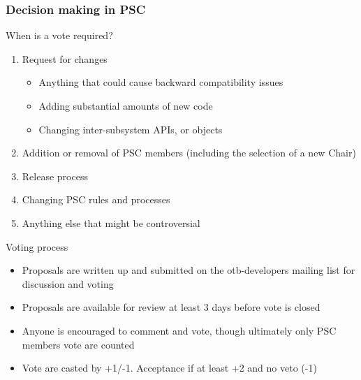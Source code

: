 \documentclass[8pt]{beamer}
\begin{document}
\begin{frame}
\frametitle{Decision making in PSC}

\begin{block}{When is a vote required?}
\begin{enumerate}
\item Request for changes
  \begin{itemize}
    \item Anything that could cause backward compatibility issues
    \item Adding substantial amounts of new code
    \item Changing inter-subsystem APIs, or objects
  \end{itemize}
\item Addition or removal of PSC members (including the selection of a new Chair)
\item Release process 
\item Changing PSC rules and processes
\item Anything else that might be controversial 
\end{enumerate}
\end{block}
\begin{block}{Voting process}
\begin{itemize}
\item Proposals are written up and submitted on the otb-developers mailing list for discussion and voting
\item Proposals are available for review at least 3 days before vote is closed
\item Anyone is encouraged to comment and vote, though ultimately only PSC members vote are counted
\item Vote are casted by +1/-1. Acceptance if at least +2 and no veto (-1)
\end{itemize}
\end{block}
\end{frame}
\end{document}
